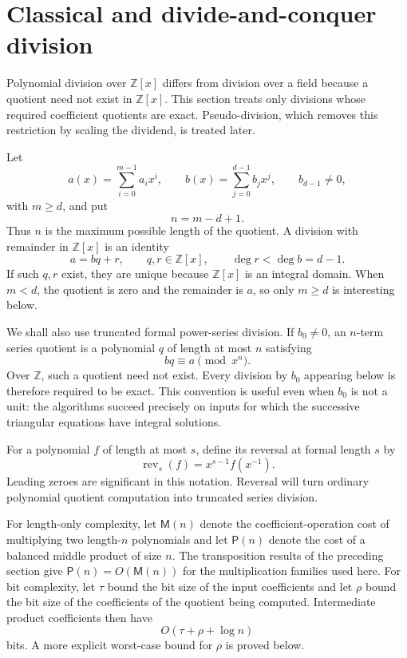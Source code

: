 \documentclass[11pt]{book}
\theoremstyle{definition}
\newcommand{\ZZ}{\mathbb Z}
\begin{document}
\section{Classical and divide-and-conquer division}\label{sec:classical-division}

Polynomial division over $\ZZ[x]$ differs from division over a field because a
quotient need not exist in $\ZZ[x]$.  This section treats only divisions whose
required coefficient quotients are exact.  Pseudo-division, which removes this
restriction by scaling the dividend, is treated later.

Let
\[
 a(x)=\sum_{i=0}^{m-1}a_i x^i,
 \qquad
 b(x)=\sum_{j=0}^{d-1}b_j x^j,
 \qquad b_{d-1}\ne0,
\]
with $m\geq d$, and put
\[
 n=m-d+1.
\]
Thus $n$ is the maximum possible length of the quotient.  A division with
remainder in $\ZZ[x]$ is an identity
\begin{equation}\label{eq:division-identity}
 a=bq+r,
 \qquad
 q,r\in\ZZ[x],
 \qquad
 \deg r<\deg b=d-1.
\end{equation}
If such $q,r$ exist, they are unique because $\ZZ[x]$ is an integral domain.
When $m<d$, the quotient is zero and the remainder is $a$, so only $m\geq d$
is interesting below.

We shall also use truncated formal power-series division.  If $b_0\ne0$, an
$n$-term series quotient is a polynomial $q$ of length at most $n$ satisfying
\begin{equation}\label{eq:series-division-definition}
 bq\equiv a\pmod{x^n}.
\end{equation}
Over $\ZZ$, such a quotient need not exist.  Every division by $b_0$ appearing
below is therefore required to be exact.  This convention is useful even when
$b_0$ is not a unit: the algorithms succeed precisely on inputs for which the
successive triangular equations have integral solutions.

For a polynomial $f$ of length at most $s$, define its reversal at formal
length $s$ by
\[
 \operatorname{rev}_s(f)=x^{s-1}f(x^{-1}).
\]
Leading zeroes are significant in this notation.  Reversal will turn ordinary
polynomial quotient computation into truncated series division.

For length-only complexity, let $\mathsf M(n)$ denote the coefficient-operation
cost of multiplying two length-$n$ polynomials and let $\mathsf P(n)$ denote
the cost of a balanced middle product of size $n$.  The transposition results
of the preceding section give $\mathsf P(n)=O(\mathsf M(n))$ for the
multiplication families used here.  For bit complexity, let $\tau$ bound the
bit size of the input coefficients and let $\rho$ bound the bit size of the
coefficients of the quotient being computed.  Intermediate product
coefficients then have
\[
 O(\tau+\rho+\log n)
\]
bits.  A more explicit worst-case bound for $\rho$ is proved below.
\end{document}
